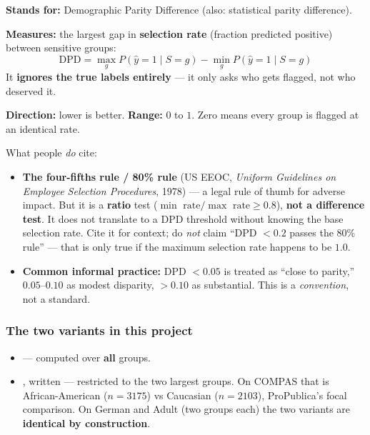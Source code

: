 \textbf{Stands for:} Demographic Parity Difference (also: statistical parity
difference).

\textbf{Measures:} the largest gap in \textbf{selection rate} (fraction
predicted positive) between sensitive groups:
\begin{equation}
\mathrm{DPD} = \max_g P(\hat y = 1 \mid S = g) - \min_g P(\hat y = 1 \mid S = g)
\end{equation}
It \textbf{ignores the true labels entirely} --- it only asks who gets flagged,
not who deserved it.

\textbf{Direction:} lower is better. \textbf{Range:} $0$ to $1$. Zero means
every group is flagged at an identical rate.

\begin{warnbox}
What people \emph{do} cite:
\begin{itemize}
\item \textbf{The four-fifths rule / 80\% rule} (US EEOC, \emph{Uniform
Guidelines on Employee Selection Procedures}, 1978) --- a legal rule of thumb
for adverse impact. But it is a \textbf{ratio} test
($\min\text{ rate}/\max\text{ rate} \ge 0.8$), \textbf{not a difference test}.
It does not translate to a DPD threshold without knowing the base selection
rate. Cite it for context; do \emph{not} claim ``DPD $<0.2$ passes the 80\%
rule'' --- that is only true if the maximum selection rate happens to be $1.0$.
\item \textbf{Common informal practice:} DPD $<0.05$ is treated as ``close to
parity,'' $0.05$--$0.10$ as modest disparity, $>0.10$ as substantial. This is a
\emph{convention}, not a standard.
\end{itemize}
\end{warnbox}

\subsubsection{The two variants in this project}
\begin{itemize}
\item {} --- computed over \textbf{all} groups.
\item {}, written \dpdtwo{} --- restricted to the two
largest groups. On COMPAS that is African-American ($n=3175$) vs Caucasian
($n=2103$), ProPublica's focal comparison. On German and Adult (two groups
each) the two variants are \textbf{identical by construction}.
\end{itemize}

